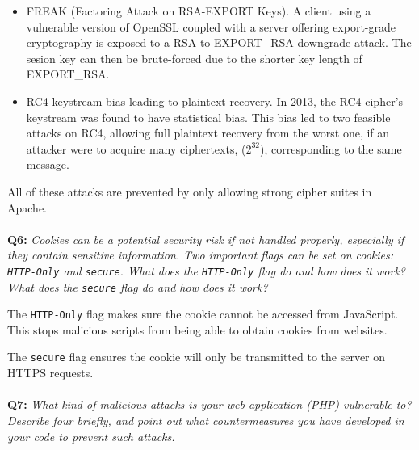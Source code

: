 \begin{itemize}
    \item
        FREAK (Factoring Attack on RSA-EXPORT Keys)\cite{freak-ssl-tls}.
        A client using a vulnerable version of OpenSSL coupled with a server offering export-grade cryptography is exposed to a RSA-to-EXPORT\_RSA downgrade attack.
        The sesion key can then be brute-forced due to the shorter key length of EXPORT\_RSA.
    \item
        RC4 keystream bias leading to plaintext recovery.
        In 2013, the RC4 cipher's keystream was found to have statistical bias\cite{usenix-rc4}.
        This bias led to two feasible attacks on RC4, allowing full plaintext recovery from the worst one, if an attacker were to acquire many ciphertexts, ($2^{32}$), corresponding to the same message.

\end{itemize}

All of these attacks are prevented by only allowing strong cipher suites in Apache.

\paragraph{}
\textbf{Q6:}
\cprotect\textit{Cookies can be a potential security risk if not handled properly, especially if they contain sensitive information. Two important flags can be set on cookies: \verb/HTTP-Only/ and \verb/secure/. What does the \verb/HTTP-Only/ flag do and how does it work? What does the \verb/secure/ flag do and how does it work?}

The \verb/HTTP-Only/ flag makes sure the cookie cannot be accessed from JavaScript. This stops malicious scripts from being able to obtain cookies from websites.

The \verb/secure/ flag ensures the cookie will only be transmitted to the server on HTTPS requests.

\paragraph{}
\textbf{Q7:}
\textit{What kind of malicious attacks is your web application (PHP) vulnerable to? Describe four briefly, and point out what countermeasures you have developed in your code to prevent such attacks.}

